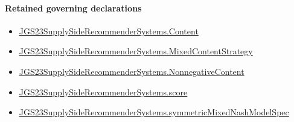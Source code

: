 \documentclass[10pt]{article}
\begin{document}
\paragraph{Retained governing declarations}
\begin{itemize}\raggedright
\item \hyperlink{governing-declaration-367305fda50f0ada}{JGS23\allowbreak{}Supply\allowbreak{}Side\allowbreak{}Recommender\allowbreak{}Systems.\allowbreak{}Content}
\item \hyperlink{governing-declaration-2089965d06cf0282}{JGS23\allowbreak{}Supply\allowbreak{}Side\allowbreak{}Recommender\allowbreak{}Systems.\allowbreak{}Mixed\allowbreak{}Content\allowbreak{}Strategy}
\item \hyperlink{governing-declaration-d426babe40b9593c}{JGS23\allowbreak{}Supply\allowbreak{}Side\allowbreak{}Recommender\allowbreak{}Systems.\allowbreak{}Nonnegative\allowbreak{}Content}
\item \hyperlink{governing-declaration-e3725af4eb21c4db}{JGS23\allowbreak{}Supply\allowbreak{}Side\allowbreak{}Recommender\allowbreak{}Systems.\allowbreak{}score}
\item \hyperlink{paper-prerequisite-b412efba7deb757f}{JGS23\allowbreak{}Supply\allowbreak{}Side\allowbreak{}Recommender\allowbreak{}Systems.\allowbreak{}symmetric\allowbreak{}Mixed\allowbreak{}Nash\allowbreak{}Model\allowbreak{}Spec}
\end{itemize}
\end{document}
